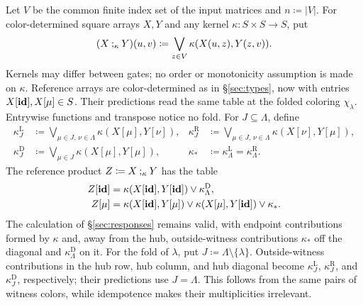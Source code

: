 Let $V$ be the common finite index set of the input matrices and
$n\coloneqq|V|$. For color-determined square arrays $X,Y$ and
any kernel $\kappa:S\times S\to S$, put
\[
 (X\mathbin{;_{\kappa}} Y)(u,v)\coloneqq
 \bigvee_{z\in V}\kappa(X(u,z),Y(z,v)).
\]
Kernels may differ between gates; no order or monotonicity assumption
is made on $\kappa$. Reference arrays are color-determined as in
\S\ref{sec:types}, now with entries $X[\mathbf{id}],X[\mu]\in S$.
Their predictions read the same table at the folded coloring
$\chi_\lambda$. Entrywise functions and transpose notice no fold.
For $J\subseteq\Lambda$, define
\begin{align*}
 \kappa_J^{\mathrm L}&\coloneqq\bigvee_{\mu\in J,\,\nu\in\Lambda}
                          \kappa(X[\mu],Y[\nu]),&
 \kappa_J^{\mathrm R}&\coloneqq\bigvee_{\mu\in J,\,\nu\in\Lambda}
                          \kappa(X[\nu],Y[\mu]),\\
 \kappa_J^{\mathrm D}&\coloneqq\bigvee_{\mu\in J}\kappa(X[\mu],Y[\mu]),&
 \kappa_*&\coloneqq\kappa_\Lambda^{\mathrm L}
                     =\kappa_\Lambda^{\mathrm R}.
\end{align*}
The reference product $Z\coloneqq X\mathbin{;_{\kappa}} Y$ has the table
\begin{align*}
 Z[\mathbf{id}]&=\kappa(X[\mathbf{id}],Y[\mathbf{id}])
            \vee\kappa_\Lambda^{\mathrm D},\\
 Z[\mu]&=\kappa(X[\mathbf{id}],Y[\mu])
          \vee\kappa(X[\mu],Y[\mathbf{id}])\vee\kappa_*.
\end{align*}
The calculation of \S\ref{sec:responses} remains valid, with
endpoint contributions formed by $\kappa$ and, away from the hub,
outside-witness contributions $\kappa_*$ off the diagonal and
$\kappa_\Lambda^{\mathrm D}$ on it. For the fold of $\lambda$,
put $J\coloneqq\Lambda\setminus\{\lambda\}$. Outside-witness contributions
in the hub row, hub column, and hub diagonal become
$\kappa_J^{\mathrm L}$, $\kappa_J^{\mathrm R}$, and
$\kappa_J^{\mathrm D}$, respectively; their predictions use
$J=\Lambda$. This follows from the same pairs of witness colors,
while idempotence makes their multiplicities irrelevant.

